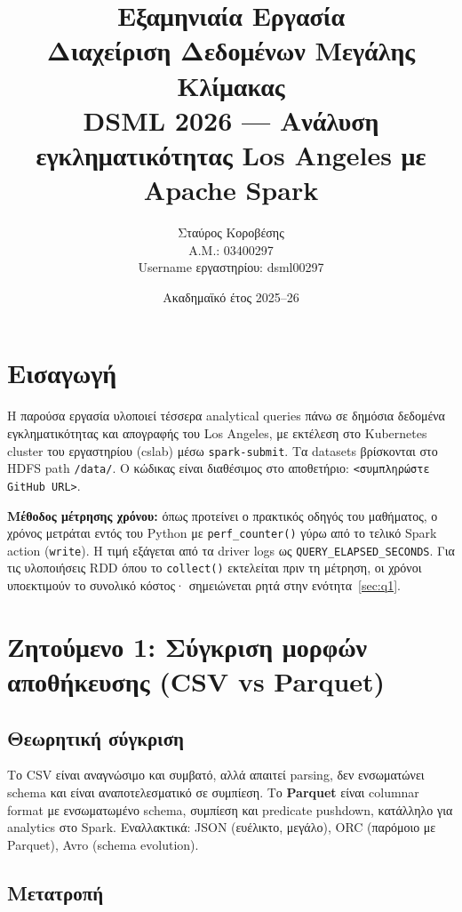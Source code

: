\documentclass[11pt,a4paper]{article}
\title{%
  \textbf{Εξαμηνιαία Εργασία}\\[0.3em]
  Διαχείριση Δεδομένων Μεγάλης Κλίμακας\\[0.5em]
  \large DSML 2026 --- Ανάλυση εγκληματικότητας Los Angeles με Apache Spark
}
\author{Σταύρος Κοροβέσης \\ Α.Μ.: 03400297 \\ Username εργαστηρίου: dsml00297}
\date{Ακαδημαϊκό έτος 2025--26}
\begin{document}
\maketitle
\tableofcontents
\newpage

\section{Εισαγωγή}

Η παρούσα εργασία υλοποιεί τέσσερα analytical queries πάνω σε δημόσια δεδομένα
εγκληματικότητας και απογραφής του Los Angeles, με εκτέλεση στο Kubernetes cluster
του εργαστηρίου (cslab) μέσω \texttt{spark-submit}. Τα datasets βρίσκονται στο
HDFS path \texttt{/data/}. Ο κώδικας είναι διαθέσιμος στο αποθετήριο:
\texttt{<συμπληρώστε GitHub URL>}.

\textbf{Μέθοδος μέτρησης χρόνου:} όπως προτείνει ο πρακτικός οδηγός του μαθήματος,
ο χρόνος μετράται εντός του Python με \texttt{perf\_counter()} γύρω από το τελικό
Spark action (\texttt{write}). Η τιμή εξάγεται από τα driver logs ως
\texttt{QUERY\_ELAPSED\_SECONDS}. Για τις υλοποιήσεις RDD όπου το \texttt{collect()}
εκτελείται πριν τη μέτρηση, οι χρόνοι υποεκτιμούν το συνολικό κόστος·
σημειώνεται ρητά στην ενότητα~\ref{sec:q1}.

\section{Ζητούμενο 1: Σύγκριση μορφών αποθήκευσης (CSV vs Parquet)}

\subsection{Θεωρητική σύγκριση}

Το CSV είναι αναγνώσιμο και συμβατό, αλλά απαιτεί parsing, δεν ενσωματώνει schema
και είναι αναποτελεσματικό σε συμπίεση. Το \textbf{Parquet} είναι columnar format
με ενσωματωμένο schema, συμπίεση και predicate pushdown, κατάλληλο για analytics
στο Spark. Εναλλακτικά: JSON (ευέλικτο, μεγάλο), ORC (παρόμοιο με Parquet),
Avro (schema evolution).

\subsection{Μετατροπή}
\end{document}
